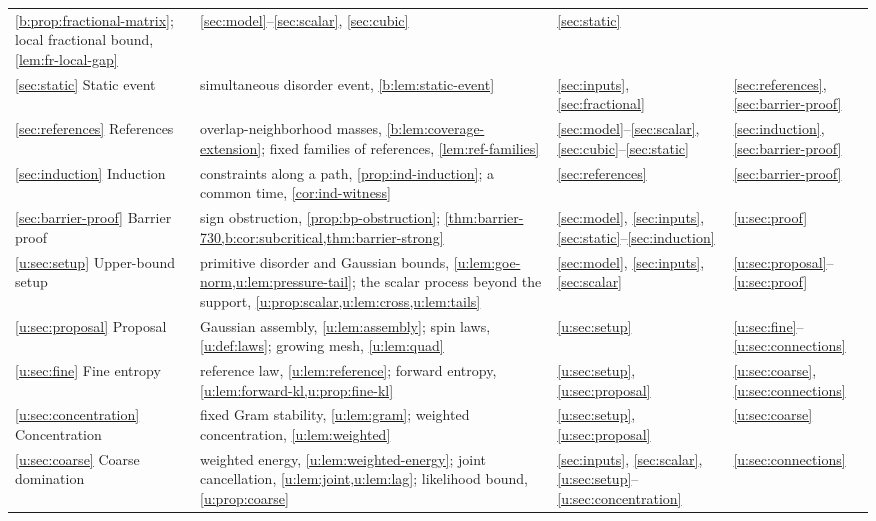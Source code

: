 \begin{table}[!t]
\begin{tabular}{@{}>{\raggedright\arraybackslash}p{}>{\raggedright\arraybackslash}p{}>{\raggedright\arraybackslash}p{}>{\raggedright\arraybackslash}p{}@{}}
 \cref{b:prop:fractional-matrix}; local fractional bound, \cref{lem:fr-local-gap}
 & \ref{sec:model}--\ref{sec:scalar}, \ref{sec:cubic} & \ref{sec:static}\\
\ref{sec:static} Static event & simultaneous disorder event, \cref{b:lem:static-event}
 & \ref{sec:inputs}, \ref{sec:fractional} & \ref{sec:references}, \ref{sec:barrier-proof}\\
\ref{sec:references} References & overlap-neighborhood masses,
 \cref{b:lem:coverage-extension}; fixed families of references,
 \cref{lem:ref-families} & \ref{sec:model}--\ref{sec:scalar}, \ref{sec:cubic}--\ref{sec:static} & \ref{sec:induction}, \ref{sec:barrier-proof}\\
\ref{sec:induction} Induction & constraints along a path, \cref{prop:ind-induction};
 a common time, \cref{cor:ind-witness} & \ref{sec:references} & \ref{sec:barrier-proof}\\
\ref{sec:barrier-proof} Barrier proof & sign obstruction, \cref{prop:bp-obstruction};
 \cref{thm:barrier-730,b:cor:subcritical,thm:barrier-strong} &
 \ref{sec:model}, \ref{sec:inputs}, \ref{sec:static}--\ref{sec:induction} &
 \ref{u:sec:proof}\\
\ref{u:sec:setup} Upper-bound setup & primitive disorder and Gaussian bounds,
 \cref{u:lem:goe-norm,u:lem:pressure-tail}; the scalar process beyond the
 support, \cref{u:prop:scalar,u:lem:cross,u:lem:tails} & \ref{sec:model},
 \ref{sec:inputs}, \ref{sec:scalar} & \ref{u:sec:proposal}--\ref{u:sec:proof}\\
\ref{u:sec:proposal} Proposal & Gaussian assembly, \cref{u:lem:assembly};
 spin laws, \cref{u:def:laws}; growing mesh, \cref{u:lem:quad} &
 \ref{u:sec:setup} & \ref{u:sec:fine}--\ref{u:sec:connections}\\
\ref{u:sec:fine} Fine entropy & reference law, \cref{u:lem:reference};
 forward entropy, \cref{u:lem:forward-kl,u:prop:fine-kl} &
 \ref{u:sec:setup}, \ref{u:sec:proposal} & \ref{u:sec:coarse},
 \ref{u:sec:connections}\\
\ref{u:sec:concentration} Concentration & fixed Gram stability,
 \cref{u:lem:gram}; weighted concentration, \cref{u:lem:weighted} &
 \ref{u:sec:setup}, \ref{u:sec:proposal} & \ref{u:sec:coarse}\\
\ref{u:sec:coarse} Coarse domination & weighted energy,
 \cref{u:lem:weighted-energy}; joint cancellation,
 \cref{u:lem:joint,u:lem:lag}; likelihood bound, \cref{u:prop:coarse} &
 \ref{sec:inputs}, \ref{sec:scalar}, \ref{u:sec:setup}--\ref{u:sec:concentration} &
 \ref{u:sec:connections}\\

\end{tabular}
\end{table}

